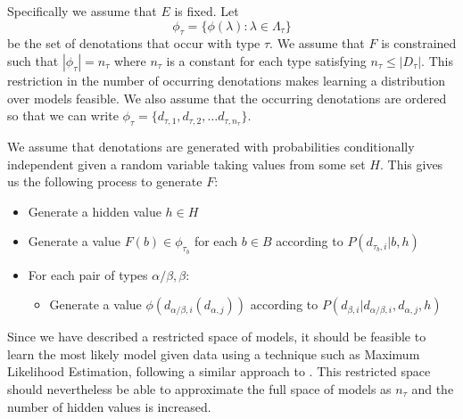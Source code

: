 \documentclass[letterpaper]{article}
\newcommand{\citet}[1]{\newcite{#1}}
\begin{document}
Specifically we assume that $E$ is fixed. Let
$$\phi_\tau = \{\phi(\lambda) : \lambda\in \Lambda_\tau\}$$
be the set of denotations that occur with type $\tau$. We assume that
$F$ is constrained such that $|\phi_\tau| = n_\tau$ where $n_\tau$
is a constant for each type satisfying $n_\tau \le |D_\tau|$. This
restriction in the number of occurring denotations makes learning a
distribution over models feasible. We also assume that the occurring
denotations are ordered so that we can write $\phi_\tau =
\{d_{\tau,1}, d_{\tau,2}, \ldots d_{\tau, n_\tau}\}$.


We assume that denotations are generated with probabilities
conditionally independent given a random variable taking values from
some set $H$. This gives us the following process to generate $F$:
\begin{itemize}
\item Generate a hidden value $h\in H$
\item Generate a value $F(b) \in \phi_{\tau_b}$ for each $b\in B$ according to
  $P(d_{\tau_b,i}|b, h)$
\item For each pair of types $\alpha/\beta, \beta$:
\begin{itemize}
\item Generate a value $\phi(d_{\alpha/\beta,i}(d_{\alpha,j}))$
  according to $P(d_{\beta,i}|d_{\alpha/\beta,i}, d_{\alpha,j},h)$
\end{itemize}
\end{itemize}

Since we have described a restricted space of models, it should be
feasible to learn the most likely model given data using a technique
such as Maximum Likelihood Estimation, following a similar approach to
\citet{Sato:95}. This restricted space should nevertheless be able to
approximate the full space of models as $n_\tau$ and the number of
hidden values is increased.

\end{document}
